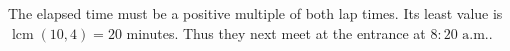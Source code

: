 The elapsed time must be a positive multiple of both lap times. Its least value is $\operatorname{lcm}(10,4)=20$ minutes. Thus they next meet at the entrance at $\boxed{8{:}20\text{ a.m.}}$.

